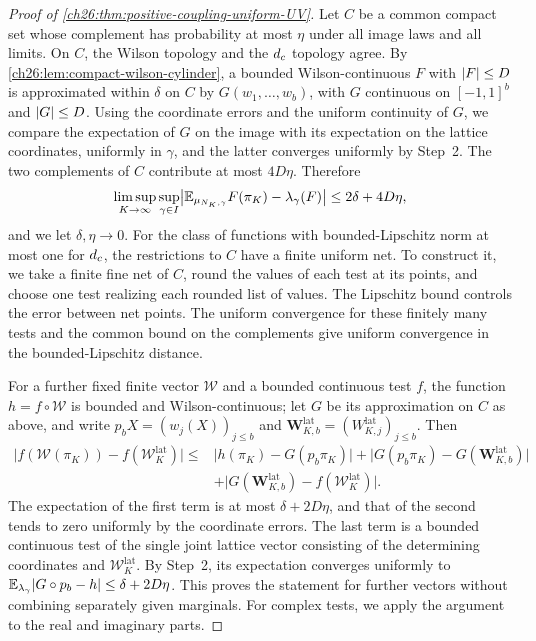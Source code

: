 \begin{proof}[Proof of \cref{ch26:thm:positive-coupling-uniform-UV}]
Let $C$ be a common compact set whose complement has probability at most $\eta$ under all image laws and all limits. On $C$, the Wilson topology and the $d_c$ topology agree. By \cref{ch26:lem:compact-wilson-cylinder}, a bounded Wilson-continuous $F$ with $\lvert F\rvert\le D$ is approximated within $\delta$ on $C$ by $G(w_1,\dots,w_b)$, with $G$ continuous on $[-1,1]^b$ and $\lvert G\rvert\le D$. Using the coordinate errors and the uniform continuity of $G$, we compare the expectation of $G$ on the image with its expectation on the lattice coordinates, uniformly in $\gamma$, and the latter converges uniformly by Step~2. The two complements of $C$ contribute at most $4D\eta$. Therefore
\[
 \limsup_{K\to\infty}\sup_{\gamma\in I}\bigl\lvert\mathbb E_{\mu_{N_K,\gamma}}F(\pi_K)-\lambda_\gamma(F)\bigr\rvert\le2\delta+4D\eta,
\]
and we let $\delta,\eta\to0$. For the class of functions with bounded-Lipschitz norm at most one for $d_c$, the restrictions to $C$ have a finite uniform net. To construct it, we take a finite fine net of $C$, round the values of each test at its points, and choose one test realizing each rounded list of values. The Lipschitz bound controls the error between net points. The uniform convergence for these finitely many tests and the common bound on the complements give uniform convergence in the bounded-Lipschitz distance.

For a further fixed finite vector $\mathscr W$ and a bounded continuous test $f$, the function $h=f\circ\mathscr W$ is bounded and Wilson-continuous; let $G$ be its approximation on $C$ as above, and write $p_bX=(w_j(X))_{j\le b}$ and $\mathbf W^{\mathrm{lat}}_{K,b}=(W^{\mathrm{lat}}_{K,j})_{j\le b}$. Then
\[
 \begin{split}
 \bigl\lvert f(\mathscr W(\pi_K))-f(\mathscr W^{\mathrm{lat}}_K)\bigr\rvert
 \le{}&\bigl\lvert h(\pi_K)-G(p_b\pi_K)\bigr\rvert
 +\bigl\lvert G(p_b\pi_K)-G(\mathbf W^{\mathrm{lat}}_{K,b})\bigr\rvert\\
 &+\bigl\lvert G(\mathbf W^{\mathrm{lat}}_{K,b})-f(\mathscr W^{\mathrm{lat}}_K)\bigr\rvert.
 \end{split}
\]
The expectation of the first term is at most $\delta+2D\eta$, and that of the second tends to zero uniformly by the coordinate errors. The last term is a bounded continuous test of the single joint lattice vector consisting of the determining coordinates and $\mathscr W^{\mathrm{lat}}_K$. By Step~2, its expectation converges uniformly to $\mathbb E_{\lambda_\gamma}\lvert G\circ p_b-h\rvert\le\delta+2D\eta$. This proves the statement for further vectors without combining separately given marginals. For complex tests, we apply the argument to the real and imaginary parts.


\end{proof}
